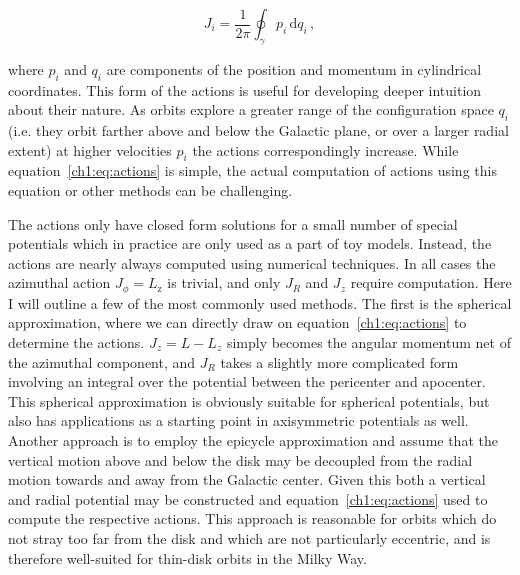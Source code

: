 \begin{equation}
    \label{ch1:eq:actions}
    J_{i} = \frac{1}{2\pi}\oint_{\gamma} p_{i}\, \mathrm{d}q_{i}\,,
\end{equation}

\noindent where $p_{i}$ and $q_{i}$ are components of the position and momentum in cylindrical coordinates. This form of the actions is useful for developing deeper intuition about their nature. As orbits explore a greater range of the configuration space $q_{i}$ (i.e. they orbit farther above and below the Galactic plane, or over a larger radial extent) at higher velocities $p_{i}$ the actions correspondingly increase. While equation~\eqref{ch1:eq:actions} is simple, the actual computation of actions using this equation or other methods can be challenging.

The actions only have closed form solutions for a small number of special potentials \parencite[again the potential of ][ for example]{henon59a} which in practice are only used as a part of toy models. Instead, the actions are nearly always computed using numerical techniques. In all cases the azimuthal action $J_{\phi} = L_\mathrm{z}$ is trivial, and only $J_{R}$ and $J_{z}$ require computation. Here I will outline a few of the most commonly used methods. The first is the spherical approximation, where we can directly draw on equation~\ref{ch1:eq:actions} to determine the actions. $J_{z} = L - L_{z}$ simply becomes the angular momentum net of the azimuthal component, and $J_{R}$ takes a slightly more complicated form involving an integral over the potential between the pericenter and apocenter. This spherical approximation is obviously suitable for spherical potentials, but also has applications as a starting point in axisymmetric potentials as well. Another approach is to employ the epicycle approximation and assume that the vertical motion above and below the disk may be decoupled from the radial motion towards and away from the Galactic center. Given this both a vertical and radial potential may be constructed and equation~\ref{ch1:eq:actions} used to compute the respective actions. This approach is reasonable for orbits which do not stray too far from the disk and which are not particularly eccentric, and is therefore well-suited for thin-disk orbits in the Milky Way.

